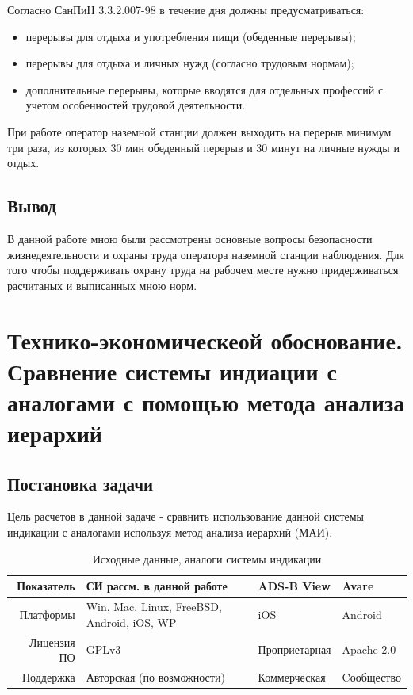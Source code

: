 \documentclass[a4paper,12pt]{report} %
\begin{document}
Согласно СанПиН 3.3.2.007-98 в течение дня должны предусматриваться:

\begin{itemize}
\item перерывы для отдыха и употребления пищи (обеденные перерывы);
\item перерывы для отдыха и личных нужд (согласно трудовым нормам);
\item дополнительные перерывы, которые вводятся для отдельных профессий с учетом особенностей трудовой деятельности.
\end{itemize}

При работе оператор наземной станции должен выходить на перерыв минимум три
раза, из которых 30 мин обеденный перерыв и 30 минут на личные нужды и отдых.

\section{Вывод}
В данной работе мною были рассмотрены основные вопросы безопасности
жизнедеятельности и охраны труда оператора наземной станции наблюдения. Для того
чтобы поддерживать охрану труда на рабочем месте нужно придерживаться расчитаных
и выписанных мною норм. %
\newpage
\chapter{Технико-экономическеой обоснование. Сравнение системы индиации с
  аналогами с помощью метода анализа иерархий} %
\section{Постановка задачи}
Цель расчетов в данной задаче - сравнить использование данной системы индикации
с аналогами используя метод анализа иерархий (МАИ).

\begin{table}[!h]
  \caption{Исходные данные, аналоги системы индикации}
  \begin{tabular}{ | r | p{6cm} | l | l |}
    \hline
    Показатель   & СИ рассм. в данной работе                  & ADS-B View    & Avare  \\
    \hline
    Платформы    & Win, Mac, Linux, FreeBSD, Android, iOS, WP & iOS           & Android \\
    \hline
    Лицензия ПО  & GPLv3                                      & Проприетарная & Apache 2.0 \\
    \hline
    Поддержка    & Авторская (по возможности)                 & Коммерческая  & Cообщество \\
    \hline
  \end{tabular}
\end{table}
\end{document}
